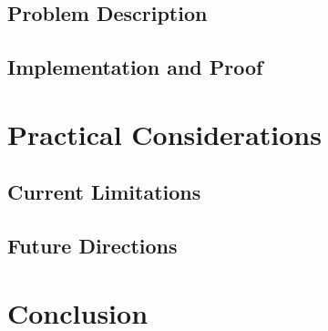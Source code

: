 \documentclass[]{rptuseminar}
\begin{document}
\subsection{Problem Description}  
\label{subsec:problem-desc}  

\subsection{Implementation and Proof}  
\label{subsec:implementation}  

\section{Practical Considerations}  
\label{sec:practical-considerations}  
\subsection{Current Limitations}  
\label{subsec:limitations}  

\subsection{Future Directions}  
\label{subsec:future}  

\section{Conclusion}  
\label{sec:conclusion}  

\newpage
\nocite{*}



\end{document}
